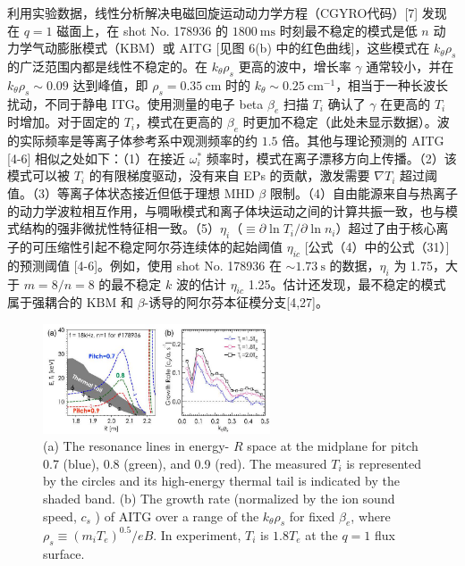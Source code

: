 \documentclass[oneside,onecolumn]{article}
\begin{document}
\begin{sloppypar}
 利用实验数据，线性分析解决电磁回旋运动动力学方程（CGYRO代码）[7] 发现在 $q=1$ 磁面上，在 shot No. 178936 的 $1800\mathrm{~ms}$ 时刻最不稳定的模式是低 $n$ 动力学气动膨胀模式（KBM）或 AITG [见图 6(b) 中的红色曲线]，这些模式在 $k_{\theta}\rho_s$ 的广泛范围内都是线性不稳定的。在 $k_{\theta}\rho_s$ 更高的波中，增长率 $\gamma$ 通常较小，并在 $k_{\theta}\rho_s\sim 0.09$ 达到峰值，即 $\rho_{s}=0.35 \mathrm{~cm}$ 时的 $k_{\theta}\sim 0.25 \mathrm{~cm}^{-1}$，相当于一种长波长扰动，不同于静电 ITG。使用测量的电子 beta $\beta_{e}$ 扫描 $T_{i}$ 确认了 $\gamma$ 在更高的 $T_{i}$ 时增加。对于固定的 $T_{i}$，模式在更高的 $\beta_{e}$ 时更加不稳定（此处未显示数据）。波的实际频率是等离子体参考系中观测频率的约 $1.5$ 倍。其他与理论预测的 AITG [4-6] 相似之处如下：（1）在接近 $\omega_{i}^{*}$ 频率时，模式在离子漂移方向上传播。（2）该模式可以被 $T_{i}$ 的有限梯度驱动，没有来自 EPs 的贡献，激发需要 $\nabla T_{i}$ 超过阈值。（3）等离子体状态接近但低于理想 MHD $\beta$ 限制。（4）自由能源来自与热离子的动力学波粒相互作用，与啁啾模式和离子体块运动之间的计算共振一致，也与模式结构的强非微扰性特征相一致。（5）$\eta_{i}$（$\equiv\partial \ln T_{i} / \partial \ln n_{i}$）超过了由于核心离子的可压缩性引起不稳定阿尔芬连续体的起始阈值 $\eta_{i c}$ [公式（4）中的公式（31）] 的预测阈值 [4-6]。例如，使用 shot No. 178936 在 $\sim1.73\mathrm{~s}$ 的数据，$\eta_{i}$ 为 1.75，大于 $m=8/n=8$ 的最不稳定 $k$ 波的估计 $\eta_{i c}$ 1.25。估计还发现，最不稳定的模式属于强耦合的 $\mathrm{KBM}$ 和 $\beta$-诱导的阿尔芬本征模分支[4,27]。
  \begin{figure}[htbp]
  	\centering
  	\includegraphics[max width=0.6\textwidth,max height=1.0\textheight]{2023_06_19_f8dbb752866ca158c73eg-5}
  	\caption{(a) The resonance lines in energy- $R$ space at the midplane for pitch 0.7 (blue), 0.8 (green), and 0.9 (red). The measured $T_{i}$ is represented by the circles and its high-energy thermal tail is indicated by the shaded band. (b) The growth rate (normalized by the ion sound speed, $c_{s}$ ) of AITG over a range of the $k_{\theta} \rho_{s}$ for fixed $\beta_{e}$, where $\rho_{s} \equiv\left(m_{i} T_{e}\right)^{0.5} / e B$. In experiment, $T_{i}$ is $1.8 T_{e}$ at the $q=1$ flux surface.}
  	\label{figure6}
  \end{figure}
  

\end{sloppypar}
\end{document}
